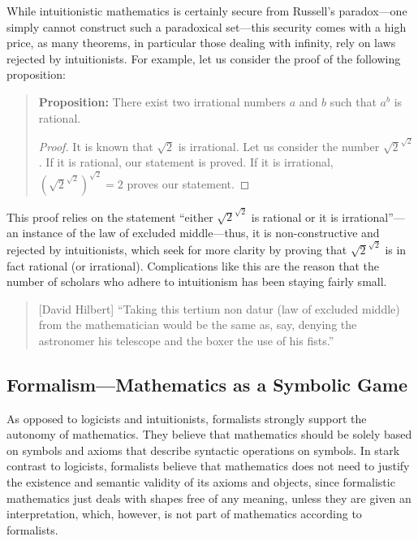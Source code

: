 \documentclass{article}
\begin{document}
While intuitionistic mathematics is certainly secure from Russell's paradox---one simply cannot construct such a paradoxical set---this security comes with a high price, as many theorems, in particular those dealing with infinity, rely on laws rejected by intuitionists. For example, let us consider the proof of the following proposition:
\begin{quote}
\textbf{Proposition:} There exist two irrational numbers $a$ and $b$ such that $a^b$ is rational.
\vspace{-2em}
\begin{proof}
	It is known that $\sqrt{2}$ is irrational. Let us consider the number $\sqrt{2}^{\sqrt{2}}$. If it is rational, our statement is proved. If it is irrational, $(\sqrt{2}^{\sqrt{2}})^{\sqrt{2}}=2$ proves our statement.
\end{proof}
\end{quote}
This proof relies on the statement ``either $\sqrt{2}^{\sqrt{2}}$ is rational or it is irrational''---an instance of the law of excluded middle---thus, it is non-constructive and rejected by intuitionists, which seek for more clarity by proving that $\sqrt{2}^{\sqrt{2}}$ is in fact rational (or irrational). Complications like this are the reason that the number of scholars who adhere to intuitionism has been staying fairly small.

\begin{quote}[David Hilbert]
``Taking this tertium non datur (law of excluded middle) from the mathematician would be the same as, say, denying the astronomer his telescope and the boxer the use of his fists.''\cite{hilbert_tertium_non_datur}
\end{quote}

\subsection{Formalism---Mathematics as a Symbolic Game}\label{ssec_formalism}
As opposed to logicists and intuitionists, formalists strongly support the autonomy of mathematics. 
They believe that mathematics should be solely based on symbols and axioms that describe syntactic operations on symbols. In stark contrast to logicists, formalists believe that mathematics does not need to justify the existence and semantic validity of its axioms and objects, since formalistic mathematics just deals with shapes free of any meaning, unless they are given an interpretation, which, however, is not part of mathematics according to formalists.
\end{document}

